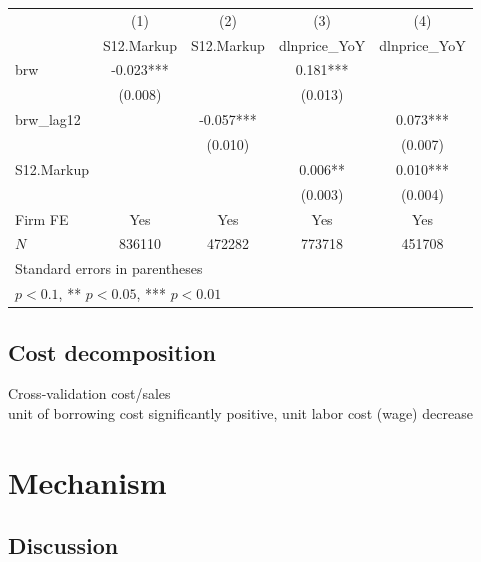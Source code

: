\documentclass[12pt]{article}
\begin{document}
\begin{center}
\begin{tabular}{l*{4}{c}}
\toprule
            &\multicolumn{1}{c}{(1)}&\multicolumn{1}{c}{(2)}&\multicolumn{1}{c}{(3)}&\multicolumn{1}{c}{(4)}\\
            &\multicolumn{1}{c}{S12.Markup}&\multicolumn{1}{c}{S12.Markup}&\multicolumn{1}{c}{dlnprice\_YoY}&\multicolumn{1}{c}{dlnprice\_YoY}\\
\midrule
brw         &      -0.023***&               &       0.181***&               \\
            &     (0.008)   &               &     (0.013)   &               \\
\addlinespace
brw\_lag12   &               &      -0.057***&               &       0.073***\\
            &               &     (0.010)   &               &     (0.007)   \\
\addlinespace
S12.Markup&               &               &       0.006** &       0.010***\\
            &               &               &     (0.003)   &     (0.004)   \\
\addlinespace
Firm FE     &         Yes   &         Yes   &         Yes   &         Yes   \\
\midrule
\(N\)       &      836110   &      472282   &      773718   &      451708   \\
\bottomrule
\multicolumn{5}{l}{\footnotesize Standard errors in parentheses}\\
\multicolumn{5}{l}{\footnotesize * \(p<0.1\), ** \(p<0.05\), *** \(p<0.01\)}\\
\end{tabular}
\end{center}


\subsection{Cost decomposition}

Cross-validation cost/sales \\
unit of borrowing cost significantly positive, unit labor cost (wage) decrease
 

\section{Mechanism}

\subsection{Discussion}
\end{document}

